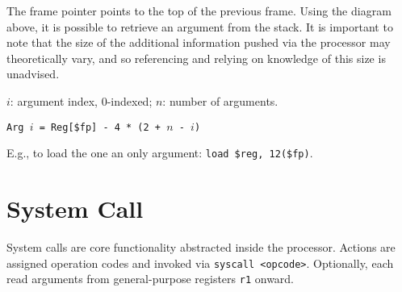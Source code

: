 \documentclass[10pt]{article}
\begin{document}
The frame pointer points to the top of the previous frame.
Using the diagram above, it is possible to retrieve an argument from the stack.
It is important to note that the size of the additional information pushed via the processor may theoretically vary, and so referencing and relying on knowledge of this size is unadvised.

\begin{center}
    \(i\): argument index, 0-indexed; \(n\): number of arguments.
    
    \texttt{Arg \(i\) = Reg[\$fp] - 4 * (2 + \(n\) - \(i\))}

    E.g., to load the one an only argument: \texttt{load \$reg, 12(\$fp)}.
\end{center}

\section{System Call}

System calls are core functionality abstracted inside the processor.
Actions are assigned operation codes and invoked via \texttt{syscall <opcode>}.
Optionally, each read arguments from general-purpose registers \texttt{r1} onward.
\end{document}
